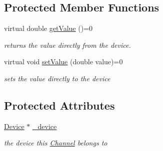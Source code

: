 \subsection*{Protected Member Functions}
\begin{DoxyCompactItemize}
\item 
virtual double \hyperlink{classdrobot_1_1device_1_1channel_1_1Channel_a42f0978ebb99d13a89c1785baf69a4d8}{get\-Value} ()=0
\begin{DoxyCompactList}\small\item\em returns the value directly from the device. \end{DoxyCompactList}\item 
virtual void \hyperlink{classdrobot_1_1device_1_1channel_1_1Channel_a612a3f6afe59e238583d6d40d9ddcaf8}{set\-Value} (double value)=0
\begin{DoxyCompactList}\small\item\em sets the value directly to the device \end{DoxyCompactList}\end{DoxyCompactItemize}
\subsection*{Protected Attributes}
\begin{DoxyCompactItemize}
\item 
\hypertarget{classdrobot_1_1device_1_1channel_1_1Channel_a065b4c1728f3756ac171c5191b780ff3}{\hyperlink{classdrobot_1_1device_1_1Device}{Device} $\ast$ \hyperlink{classdrobot_1_1device_1_1channel_1_1Channel_a065b4c1728f3756ac171c5191b780ff3}{\-\_\-device}}\label{classdrobot_1_1device_1_1channel_1_1Channel_a065b4c1728f3756ac171c5191b780ff3}

\begin{DoxyCompactList}\small\item\em the device this \hyperlink{classdrobot_1_1device_1_1channel_1_1Channel}{Channel} belongs to \end{DoxyCompactList}\end{DoxyCompactItemize}
